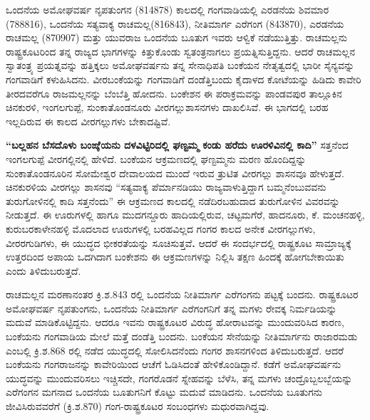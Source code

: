 ಒಂದನೆಯ ಅಮೋಘವರ್ಷ ನೃಪತುಂಗನ (814\enginline{-}878) ಕಾಲದಲ್ಲಿ ಗಂಗವಾಡಿಯಲ್ಲಿ ಎರಡನೆಯ ಶಿವಮಾರ (788\enginline{-}816), ಒಂದನೆಯ ಸತ್ಯವಾಕ್ಯ ರಾಚಮಲ್ಲ(816\enginline{-}843), ನೀತಿಮಾರ್ಗ ಎರೆಗಂಗ (843\enginline{-}870), ಎರಡನೆಯ ರಾಚಮಲ್ಲ (870\enginline{-}907) ಮತ್ತು ಯುವರಾಜ ಒಂದನೆಯ ಬೂತುಗ ಇವರು ಆಳ್ವಿಕೆ ನಡೆಯುತ್ತಿತ್ತು. ರಾಚಮಲ್ಲನು ರಾಷ್ಟ್ರಕೂಟರಿಂದ ತನ್ನ ರಾಜ್ಯದ ಭಾಗಗಳನ್ನು ಕಿತ್ತುಕೊಂಡು ಸ್ವತಂತ್ರನಾಗಲು ಪ್ರಯತ್ನಿಸುತ್ತಿದ್ದನು. ಆದರೆ ರಾಚಮಲ್ಲನ ಸ್ವಾತಂತ್ರ್ಯ ಪ್ರಯತ್ನವನ್ನು ಹತ್ತಿಕ್ಕಲು ಅಮೋಘವರ್ಷನು ತನ್ನ ಸೇನಾಧಿಪತಿ ಬಂಕೆಯನ ನೇತೃತ್ವದಲ್ಲಿ ಭಾರೀ ಸೈನ್ಯವನ್ನು ಗಂಗವಾಡಿಗೆ ಕಳುಹಿಸಿದನು. ವೀರಬಂಕೆಯನ್ನು ಗಂಗವಾಡಿಗೆ ದಂಡೆತ್ತಿಬಂದು ಕೈದಾಳದ ಕೋಟೆಯನ್ನು ಹಿಡಿದು ಕಾವೇರಿ ತೀರದವರೆಗೂ ರಾಜಮಲ್ಲನನ್ನು ಬೆಂಬೆತ್ತಿ ಹೋದನು. ಬಂಕೇಶನ ಈ ಪರಾಕ್ರಮವನ್ನು ಪಾಂಡವಪುರ ತಾಲ್ಲೂಕಿನ ಚಿನಕುರಳಿ, ಇಂಗಲಗುಪ್ಪೆ, ಸುಂಕಾತೊಂಡನೂರು ವೀರಗಲ್ಲುಶಾಸನಗಳು ದಾಖಲಿಸಿವೆ. ಈ ಭಾಗದಲ್ಲಿ ಬರಹ ಇಲ್ಲದಿರುವ ಈ ಕಾಲದ ವೀರಗಲ್ಲುಗಳು ಬೇಕಾದಷ್ಟಿವೆ.

\textbf{ “ಬಲ್ಲಹನ ಬೆಸದೊಳು ಬಂಙ್ಕೆಯನು ದಳವಿಟ್ಟಿರಿದಲ್ಲಿ ಘಣ್ಟಮ್ಮ ಕಂಡು ಹರೆದು ಊರಳಿವಿನಲ್ಲಿ ಕಾದಿ”} ಸತ್ತನೆಂದ ಇಂಗಲಗುಪ್ಪೆ ವೀರಗಲ್ಲಿನಲ್ಲಿ ಹೇಳಿದೆ. ಬಂಕೆಯನ ಆಕ್ರಮಣದಲ್ಲಿ ಘಣ್ಟಮ್ಮನು ಮರಣ ಹೊಂದಿದ್ದನ್ನು ಸುಂಕಾತೊಂಡನೂರಿನ ಸೋಮೇಶ್ವರ ದೇವಾಲಯದ ಮುಂದೆ ಇರುವ ತ್ರುಟಿತ ವೀರಗಲ್ಲು ಶಾಸನವೂ ಹೇಳುತ್ತದೆ. ಚಿನಕುರಳಿಯ ವೀರಗಲ್ಲು ಶಾಸನವು “ಸತ್ಯವಾಕ್ಯ ಪೆರ್ಮಾನಡಿಯು ರಾಜ್ಯವಾಳುತ್ತಿದ್ದಾಗ ಬಮ್ಮನೆಂಬುವವನು ತುರುಗೋಳಿನಲ್ಲಿ ಕಾದಿ ಸತ್ತನೆಂದು” ಈ ಆಕ್ರಮಣದ ಕಾಲದಲ್ಲಿ ನಡೆದಿರಬಹುದಾದ ತುರುಗೋಳಿನ ವಿವರವನ್ನು ನೀಡುತ್ತದೆ. ಈ ಊರುಗಳಲ್ಲಿ ಹಾಗೂ ಮುದಗನ್ದೂರು ಹಾದಿಯಲ್ಲಿರುವ, ಚಟ್ಟಮಗೆರೆ, ಹಾದನೂರು, ಕೆ. ಮಂಚನಹಳ್ಳಿ, ಕುರುಬರಕಾಳೇನಹಳ್ಳಿ ಮೊದಲಾದ ಊರುಗಳಲ್ಲಿ ಬರಹವಿಲ್ಲದ ಗಂಗರ ಕಾಲದ ಅನೇಕ ವೀರಗಲ್ಲುಗಳು, ವೀರರಗುಡಿಗಳು, ಈ ಯುದ್ಧದ ಭೀಕರತೆಯನ್ನು ಸೂಚಿಸುತ್ತವೆ\textbf{.} ಆದರೆ ಈ ಸಂದರ್ಭದಲ್ಲಿ ರಾಷ್ಟ್ರಕೂಟ ಸಾಮ್ರಾಜ್ಯಕ್ಕೆ ಉತ್ತರದಿಂದ ಅಪಾಯ ಒದಗಿದಾಗ ಬಂಕೇಶನು ಈ ಆಕ್ರಮಣಗಳನ್ನು ನಿಲ್ಲಿಸಿ ತಕ್ಷಣ ಹಿಂದಕ್ಕೆ ಹೋಗಬೇಕಾಯಿತು ಎಂದು ತಿಳಿದುಬರುತ್ತದೆ.

ರಾಚಮಲ್ಲನ ಮರಣಾನಂತರ ಕ್ರಿ.ಶ.843 ರಲ್ಲಿ ಒಂದನೆಯ ನೀತಿಮಾರ್ಗ ಎರೆಗಂಗನು ಪಟ್ಟಕ್ಕೆ ಬಂದನು. ರಾಷ್ಟ್ರಕೂಟರ ಅಮೋಘವರ್ಷ ನೃಪತುಂಗನು, ಒಂದನೆಯ ನೀತಿಮಾರ್ಗ ಎರೆಗಂಗನಿಗೆ ತನ್ನ ಮಗಳು ರೇವಕ್ಕ ನಿರ್ಮಡಿಯನ್ನು ಮದುವೆ ಮಾಡಿಕೊಟ್ಟಿದ್ದನು. ಆದರೂ ಇವನು ರಾಷ್ಟ್ರಕೂಟರ ವಿರುದ್ಧ ಹೋರಾಟವನ್ನು ಮುಂದುವರಿಸಿದ ಕಾರಣ, ಬಂಕೆಯನು ಗಂಗವಾಡಿಯ ಮೇಲೆ ಮತ್ತೆ ದಂಡೆತ್ತಿ ಬಂದನು. ಬಂಕೆಯನ ಸೇನೆಯನ್ನು ನೀತಿಮಾರ್ಗನು ರಾಜಾರಮಡು ಎಂಬಲ್ಲಿ ಕ್ರಿ.ಶ.868 ರಲ್ಲಿ ನಡೆದ ಯುದ್ಧದಲ್ಲಿ ಸೋಲಿಸಿದನೆಂದು ಗಂಗರ ಶಾಸನಗಳಿಂದ ತಿಳಿದುಬರುತ್ತದೆ. ಆದರೆ ಬಂಕೆಯನು ಗಂಗರಾಜನನ್ನು ಕಾವೇರಿಯಿಂದ ಆಚೆಗೆ ಓಡಿಸಿದಂತೆ ಹೇಳಿಕೊಂಡಿದ್ದಾನೆ. ಕಡೆಗೆ ಅಮೋಘವರ್ಷನು ಯುದ್ಧವನ್ನು ಮುಂದುವರಿಸಲು ಇಚ್ಚಿಸದೇ, ಗಂಗರೊಡನೆ ಸ್ನೇಹವನ್ನು ಬೆಳೆಸಿ, ತನ್ನ ಮಗಳು ಚಂದ್ರೊಬ್ಬಲಬ್ಬೆಯನ್ನು ಎರೆಗಂಗನ ಮಗನಾದ ಒಂದನೆಯ ಬೂತುಗನಿಗೆ ಕೊಟ್ಟು ಮದುವೆ ಮಾಡಿದನು. ಒಂದನೆಯ ಬೂತುಗನು ಜೀವಿಸಿರುವವರೆಗೆ (ಕ್ರಿ.ಶ.870) ಗಂಗ-ರಾಷ್ಟ್ರಕೂಟರ ಸಂಬಂಧಗಳು ಮಧುರವಾಗಿದ್ದವು.

